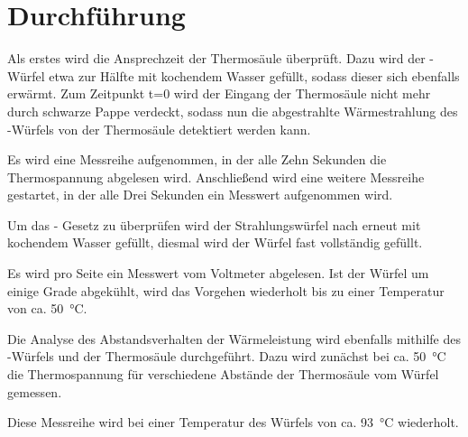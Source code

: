 
\section{Durchführung}
Als erstes wird die Ansprechzeit der Thermosäule überprüft. Dazu wird der -Würfel etwa zur Hälfte mit kochendem Wasser gefüllt, sodass dieser sich ebenfalls erwärmt. Zum Zeitpunkt t=0 wird der Eingang der Thermosäule nicht mehr durch schwarze Pappe verdeckt, sodass nun die abgestrahlte Wärmestrahlung des -Würfels von der Thermosäule detektiert werden kann.

Es wird eine Messreihe aufgenommen, in der alle Zehn Sekunden die Thermospannung abgelesen wird.
Anschließend wird eine weitere Messreihe gestartet, in der alle Drei Sekunden ein Messwert aufgenommen wird.


Um das - Gesetz zu überprüfen wird der Strahlungswürfel nach  erneut mit kochendem Wasser gefüllt, diesmal wird der Würfel fast vollständig gefüllt.

Es wird pro Seite ein Messwert vom Voltmeter abgelesen. Ist der Würfel um einige Grade abgekühlt, wird das Vorgehen wiederholt bis zu einer Temperatur von ca. \SI{50}{\celsius}.

Die Analyse des Abstandsverhalten der Wärmeleistung wird ebenfalls mithilfe des -Würfels und der Thermosäule durchgeführt. Dazu wird zunächst bei ca. \SI{50}{\celsius} die Thermospannung für verschiedene Abstände der Thermosäule vom Würfel gemessen.

Diese Messreihe wird bei einer Temperatur des Würfels von ca. \SI{93}{\celsius} wiederholt.
